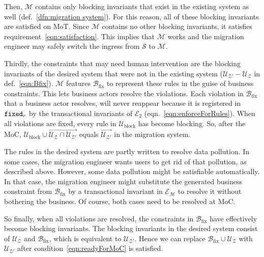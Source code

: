\documentclass[runningheads]{llncs}
\newcommand{\rules}{\mathcal{U}}
\newcommand{\transactions}{\mathcal{E}}
\newcommand{\busConstraints}{\mathcal{B}}
\newcommand{\schema}{\mathscr{Z}}
\newcommand{\migrsys}{\mathscr{M}}
\newcommand{\infsys}{\mathscr{S}}
\begin{document}
   Then, $\migrsys$ contains only blocking invariants that exist in the existing system as well (def.~\ref{dfn:migration system}).
   For this reason, all of these blocking invariants are satisfied on MoT.
   Since $\migrsys$ contains no other blocking invariants, it satisfies requirement~\ref{eqn:satisfaction}.
   This implies that $\migrsys$ works and the migration engineer may safely switch the ingress from $\infsys$ to $\migrsys$.

   Thirdly, the constraints that may need human intervention are the blocking invariants of the desired system that were not in the existing system ($\rules_{\schema'}-\rules_{\schema}$ in def.~\ref{eqn:Bfix}).
   $\migrsys$ features $\busConstraints_\text{fix}$ to represent these rules in the guise of business constraints.
   This lets business actors resolve the violations.
   Each violation in $\busConstraints_\text{fix}$ that a business actor resolves,
   will never reappear because it is registered in ${\tt fixed}_r$ by the transactional invariants of $\transactions_2$ (eqn.~\ref{eqn:enforceForRules}).
   When all violations are fixed, every rule in $\rules_\text{block}$ has become blocking.
   So, after the MoC, $\rules_\text{block}\cup\overrightarrow{\rules_{\schema}\cap\rules_{\schema'}}$ equals $\overrightarrow{\rules_{\schema'}}$ in the migration system.

   The rules in the desired system are partly written to resolve data pollution.
   In some cases, the migration engineer wants users to get rid of that pollution, as described above.
   However, some data pollution might be satisfiable automatically.
   In that case, the migration engineer might substitute the generated business constraint from $\busConstraints_\text{fix}$ by a transactional invariant in $\transactions_{\migrsys}$ to resolve it without bothering the business.
   Of course, both cases need to be resolved at MoC.

   So finally, when all violations are resolved, the constraints in $\busConstraints_\text{fix}$ have effectively become blocking invariants.
   The blocking invariants in the desired system consist of $\rules_{\schema}$ and $\busConstraints_\text{fix}$, which is equivalent to $\rules_{\schema'}$.
   Hence we can replace $\busConstraints_\text{fix}\cup\rules_{\schema}$ with $\rules_{\schema'}$ after condition~\ref{eqn:readyForMoC} is satisfied.
\end{document}
